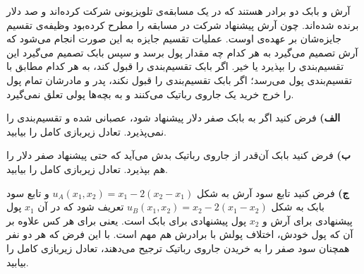 آرش و بابک دو برادر هستند که در یک مسابقه‌ی تلویزیونی شرکت کرده‌اند و صد دلار برنده شده‌اند. چون آرش پیشنهاد شرکت در مسابقه را مطرح کرده‌بود وظیفه‌ی تقسیم جایزه‌شان بر عهده‌ی اوست. عملیات تقسیم جایزه به این صورت انجام می‌شود که آرش تصمیم می‌گیرد به هر کدام چه مقدار پول برسد و سپس بابک تصمیم می‌گیرد این تقسیم‌بندی را بپذیرد یا خیر. اگر بابک تقسیم‌بندی را قبول کند، به هر کدام مطابق با تقسیم‌بندی پول می‌رسد؛ اگر بابک تقسیم‌بندی را قبول نکند، پدر و مادرشان تمام پول را خرج خرید یک جاروی رباتیک می‌کنند و به بچه‌ها پولی تعلق نمی‌گیرد.
\vspace{10pt}

\textbf{الف)}
فرض کنید اگر به بابک صفر دلار پیشنهاد شود، عصبانی شده و تقسیم‌بندی را نمی‌پذیرد. تعادل زیربازی کامل را بیابید.
\vspace{5pt}

\textbf{ب)}
فرض کنید بابک آن‌قدر از جاروی رباتیک بدش می‌آید که حتی پیشنهاد صفر دلار را هم بپذیرد. تعادل زیربازی کامل را بیابید.
\vspace{5pt}

\textbf{ج)}
فرض کنید تابع سود آرش به شکل
$u_A(x_1, x_2) = x_1 - 2(x_2 - x_1)$
و تابع سود بابک به شکل
$u_B(x_1, x_2) = x_2 - 2(x_1 - x_2)$
تعریف شود که در آن
$x_1$
پول پیشنهادی برای آرش و
$x_2$
پول پیشنهادی برای بابک است. یعنی برای هر کس علاوه بر آن که پول خودش، اختلاف پولش با برادرش هم مهم است. با این فرض که هر دو نفر همچنان سود صفر را به خریدن جاروی رباتیک ترجیح می‌دهند، تعادل زیربازی کامل را بیابید.